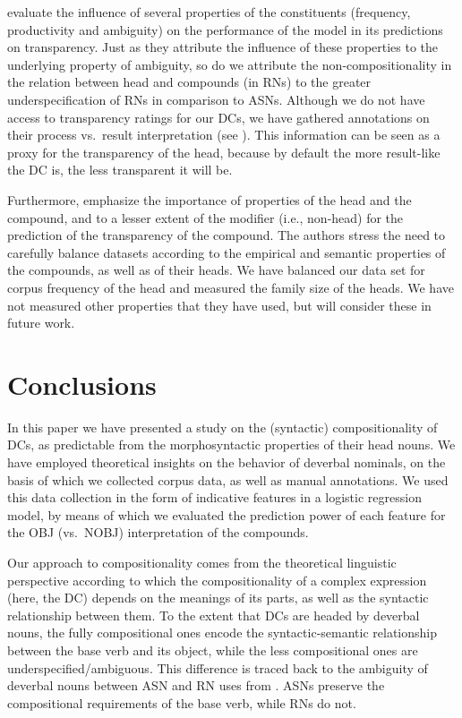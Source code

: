 \documentclass[output=paper]{langsci/langscibook}
\begin{document}
\cite{SchulteImWaldeEtAl:16} evaluate the influence of several properties of the constituents (frequency, productivity and ambiguity) on the performance of the model in its predictions on transparency. Just as they attribute the influence of these properties to the underlying property of ambiguity, 
so do we attribute the non-compositionality in the relation between head and compounds (in RNs) to the greater underspecification of RNs in comparison to ASNs. Although we do not have access to transparency ratings for our DCs, we have gathered annotations on their process vs.\ result interpretation (see ). This information can be seen as a proxy for the transparency of the head, because by default the more result-like the DC is, the less transparent it will be.

Furthermore, \cite{SchulteImWaldeEtAl:16} emphasize the importance of properties of the head and the compound, and to a lesser extent of the modifier (i.e., non-head) for the prediction of the  transparency of the compound.  The authors stress the need to carefully balance  datasets according to the empirical and semantic properties of the compounds, as well as of their heads. We have balanced our data set for corpus frequency of the head   and measured the family size of the heads. We have not measured  other properties that they have used, but will consider these in future work. 

\section{Conclusions}\label{sec:conclusions}

In this paper we have presented a study on the  {(syntactic)} compositionality of DCs, as predictable from the morphosyntactic properties of their head nouns. We have employed theoretical insights on the behavior of deverbal nominals, on the basis of which we collected corpus data, as well as manual annotations. We used this data collection in the form  of indicative features in a logistic regression model, by means of which we evaluated the prediction power of each feature for the OBJ (vs.~NOBJ) interpretation of the compounds. 

Our approach to compositionality comes from the theoretical linguistic perspective according to which the compositionality of a complex expression (here, the DC) depends on the meanings of its parts, as well as the syntactic relationship between them. To the extent that DCs are headed by deverbal nouns, the fully compositional ones encode the syntactic-semantic relationship between the base verb and its object,  while the less compositional ones are underspecified/ambiguous. This difference is traced back to the ambiguity of deverbal nouns between ASN and RN uses from \cite{grimshaw:90}. ASNs preserve the compositional requirements of the base verb, while RNs do not.
\end{document}
